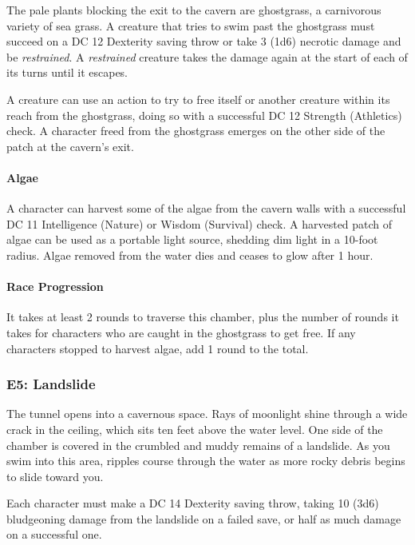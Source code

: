 \documentclass[letterpaper, 11pt, bg=full, twocolumn]{dndbook}
\begin{document}
The pale plants blocking the exit to the cavern are ghostgrass, a carnivorous variety of sea grass. A creature that tries to swim past the ghostgrass must succeed on a DC 12 Dexterity saving throw or take 3 (1d6) necrotic damage and be \textit{restrained}. A \textit{restrained} creature takes the damage again at the start of each of its turns until it escapes.

A creature can use an action to try to free itself or another creature within its reach from the ghostgrass, doing so with a successful DC 12 Strength (Athletics) check. A character freed from the ghostgrass emerges on the other side of the patch at the cavern's exit.

\paragraph{Algae}

A character can harvest some of the algae from the cavern walls with a successful DC 11 Intelligence (Nature) or Wisdom (Survival) check. A harvested patch of algae can be used as a portable light source, shedding dim light in a 10-foot radius. Algae removed from the water dies and ceases to glow after 1 hour.

\paragraph{Race Progression}

It takes at least 2 rounds to traverse this chamber, plus the number of rounds it takes for characters who are caught in the ghostgrass to get free. If any characters stopped to harvest algae, add 1 round to the total.

\subsubsection{E5: Landslide}

\begin{DndReadAloud}
The tunnel opens into a cavernous space. Rays of moonlight shine through a wide crack in the ceiling, which sits ten feet above the water level. One side of the chamber is covered in the crumbled and muddy remains of a landslide.
As you swim into this area, ripples course through the water as more rocky debris begins to slide toward you.
\end{DndReadAloud}

Each character must make a DC 14 Dexterity saving throw, taking 10 (3d6) bludgeoning damage from the landslide on a failed save, or half as much damage on a successful one.
\end{document}
